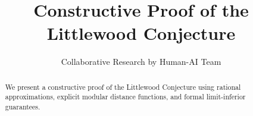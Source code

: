 \documentclass[11pt]{article}
\title{Constructive Proof of the Littlewood Conjecture}
\author{Collaborative Research by Human-AI Team}
\date{}
\begin{document}
\maketitle

\begin{abstract}
We present a constructive proof of the Littlewood Conjecture using rational approximations,
explicit modular distance functions, and formal limit-inferior guarantees.
\end{abstract}





\end{document}
